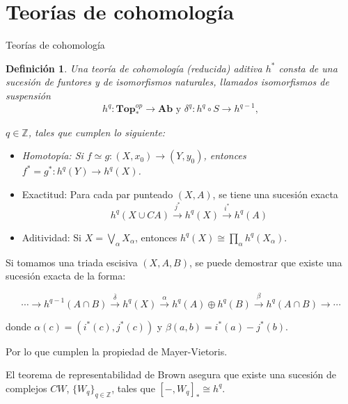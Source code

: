 \documentclass{beamer}
\newtheorem{df}{Definici\'on}
\newcommand{\T}{\mathbf{Top}}
\newcommand{\G}{\mathbf{Ab}}
\newcommand{\Z}{\mathbb{Z}}
\begin{document}
\section{Teorías de cohomología}
\begin{frame}{Teorías de cohomología}
\begin{df}
Una teor\'ia de cohomología (reducida) aditiva $h^{\ast}$ consta de una sucesi\'on de funtores y de isomorfismos naturales, llamados isomorfismos de suspensi\'on
\[h^{q}:\T_{\ast}^{op}\to\G \mbox{ y } \delta^{q}:h^{q}\circ S\to h^{q-1},\]

$q\in\Z$, tales que cumplen lo siguiente:
\begin{itemize}
    \item Homotop\'ia: Si $f\simeq g:(X,x_{0})\to(Y,y_{0})$, entonces $f^{\ast}=g^{\ast}:h^{q}(Y)\to h^{q}(X)$.
\end{itemize}
\end{df}    
\end{frame}

\begin{frame}
\begin{itemize}
\item Exactitud: Para cada par punteado $(X,A)$, se tiene una sucesi\'on exacta
\[h^{q}(X\cup CA)\xrightarrow{j^{\ast}} h^{q}(X)\xrightarrow{i^{\ast}} h^{q}(A)\]
\item Aditividad: Si $X=\bigvee_{\alpha}X_{\alpha}$, entonces $h^{q}(X)\cong\prod_{\alpha} h^{q}(X_{\alpha})$.
\end{itemize}
\end{frame}

\begin{frame}
Si tomamos una triada escisiva $(X,A,B)$, se puede demostrar que existe una sucesi\'on exacta de la forma:

\[\cdots\rightarrow h^{q-1}(A\cap B)\xrightarrow{\overline{\delta}}h^{q}(X)\xrightarrow{\alpha}h^{q}(A)\oplus h^{q}(B)\xrightarrow{\beta}h^{q}(A\cap B)\rightarrow\cdots\]

donde $\alpha(c)=(i^{\ast}(c),j^{\ast}(c))$ y $\beta(a,b)=i^{\ast}(a)-j^{\ast}(b)$.

Por lo que cumplen la propiedad de Mayer-Vietoris.
\end{frame}

\begin{frame}
El teorema de representabilidad de Brown asegura que existe una sucesi\'on de complejos $CW$, $\{W_{q}\}_{q\in\Z}$, tales que $[-,W_{q}]_{\ast}\cong h^{q}$.
\end{frame}
\end{document}

